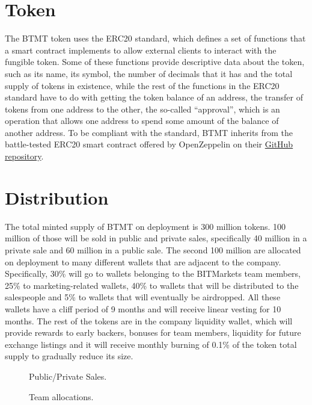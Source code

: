 \documentclass[a4paper,12pt]{article}
\begin{document}
\section{Token}

The BTMT token uses the ERC20 standard, which defines a set of functions that a smart contract implements to allow external clients to interact with the fungible
token. Some of these functions provide descriptive data about the token, such as its name, its symbol, the number of decimals that it has and the total supply of tokens in existence, while the rest of the functions in the ERC20 standard have to do with getting the token balance of an address,
the transfer of tokens from one address to the other,
the so-called ``approval'', which is an operation that allows one address to spend some amount of the balance of another address. To be compliant with the standard, BTMT inherits from the battle-tested ERC20 smart contract offered by OpenZeppelin on their \href{https://github.com/OpenZeppelin/openzeppelin-contracts/blob/master/contracts/token/ERC20/ERC20.sol}{GitHub repository}.

\section{Distribution}
The total minted supply of BTMT on deployment is 300 million tokens.
100 million of those will be sold in public and private sales, specifically 40 million in a private sale and 60 million in a public sale.
The second 100 million are allocated on deployment to many different wallets that are adjacent to the company. Specifically, 30\% will go to wallets belonging to the BITMarkets team members, 25\% to marketing-related wallets, 40\% to wallets that will be distributed to the salespeople and 5\% to wallets that will eventually be airdropped. All these wallets have a cliff period of 9 months and will receive linear vesting for 10 months. The rest of the tokens are in the company liquidity wallet, which will provide rewards to early backers, bonuses for team members, liquidity for future exchange listings and it will receive monthly burning of 0.1\% of the token total supply to gradually reduce its size.

\begin{figure}[h!]
\centering

\begin{minipage}[3cm]{.45\textwidth}
\centering
{}
\caption{Public/Private Sales.}
\end{minipage}\qquad
\begin{minipage}[3cm]{.45\textwidth}
\centering
{}
\caption{Team allocations.}
\label{fig:allocations}
\end{minipage}

\end{figure}
\end{document}
